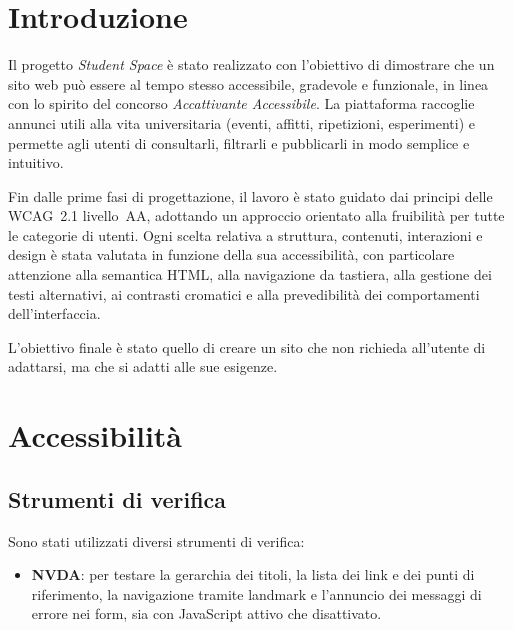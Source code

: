 \documentclass[a4paper,12pt]{article}
\begin{document}
\begin{titlepage}
\begin{tabular}{r|l}
        \end{tabular}

        \vfill

    \end{titlepage}  
    \newpage
\clearpage 
{}
\section{Introduzione}

Il progetto \emph{Student Space} è stato realizzato con l’obiettivo di dimostrare che un sito web 
può essere al tempo stesso accessibile, gradevole e funzionale, in linea con lo spirito del 
concorso \emph{Accattivante Accessibile}. La piattaforma raccoglie annunci utili alla vita 
universitaria (eventi, affitti, ripetizioni, esperimenti) e permette agli utenti di consultarli, 
filtrarli e pubblicarli in modo semplice e intuitivo.

Fin dalle prime fasi di progettazione, il lavoro è stato guidato dai principi delle WCAG~2.1 
livello~AA, adottando un approccio orientato alla fruibilità per tutte le 
categorie di utenti. Ogni scelta relativa a struttura, contenuti, interazioni e design è stata 
valutata in funzione della sua accessibilità, con particolare attenzione alla semantica HTML, 
alla navigazione da tastiera, alla gestione dei testi alternativi, ai contrasti cromatici e alla 
prevedibilità dei comportamenti dell’interfaccia.

L’obiettivo finale è stato quello di creare un sito che non richieda all’utente di adattarsi, ma 
che si adatti alle sue esigenze.

\section{Accessibilità}

\subsection{Strumenti di verifica}

Sono stati utilizzati diversi strumenti di verifica:
\begin{itemize}
    \item \textbf{NVDA}: per testare la gerarchia dei titoli, la lista dei link e dei punti di riferimento, la navigazione tramite landmark e l’annuncio dei messaggi di errore nei form, sia con JavaScript attivo che disattivato.
\end{itemize}
\end{document}
